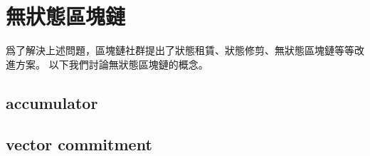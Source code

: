 \section{無狀態區塊鏈}
爲了解決上述問題，區塊鏈社群提出了狀態租賃、狀態修剪、無狀態區塊鏈等等改進方案。
以下我們討論無狀態區塊鏈的概念。


\subsection{accumulator}
\subsection{vector commitment}
